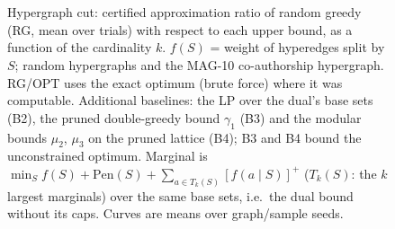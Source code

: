 \begin{figure}[t]
\centering
\setlength{\rgplotwidth}{0.49\columnwidth}
\\[1pt]
\hfill
\\

\caption{Hypergraph cut: certified approximation ratio of random greedy (RG, mean over trials) with respect to each upper bound, as a function of the cardinality $k$. $f(S)$ = weight of hyperedges split by $S$; random hypergraphs and the MAG-10 co-authorship hypergraph. RG/OPT uses the exact optimum (brute force) where it was computable. Additional baselines: the LP over the dual's base sets (B2), the pruned double-greedy bound $\gamma_1$ (B3) and the modular bounds $\mu_2$, $\mu_3$ on the pruned lattice (B4); B3 and B4 bound the unconstrained optimum. Marginal is $\min_S f(S)+\mathrm{Pen}(S)+\sum_{a\in T_k(S)}[f(a\mid S)]^+$ ($T_k(S)$: the $k$ largest marginals) over the same base sets, i.e.\ the dual bound without its caps. Curves are means over graph/sample seeds.}
\label{fig:rg-hypergraph_cut-baselines}
\end{figure}
